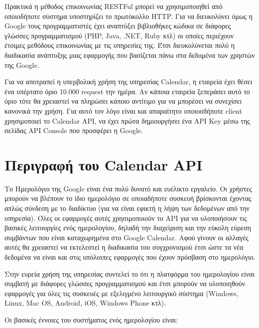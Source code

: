 Πρακτικά η μέθοδος επικοινωνίας RESTFul μπορεί να χρησιμοποιηθεί από οποιοδήποτε σύστημα υποστηρίζει το πρωτόκολλο HTTP. Για να διευκολύνει όμως η Google τους προγραμματιστές έχει αναπτύξει βιβλιοθήκες κώδικα σε διάφορες γλώσσες προγραμματισμού (PHP, Java, .NET, Ruby κτλ) οι οποίες περιέχουν έτοιμες μεθόδους επικοινωνίας με τις υπηρεσίες της. Έτσι διευκολύνεται πολύ η διαδικασία ανάπτυξης μιας εφαρμογής που βασίζεται πάνω στα δεδομένα των χρηστών της Google.

Για να αποτραπεί η υπερβολική χρήση της υπηρεσίας Calendar, η εταιρεία έχει θέσει ένα υπέρτατο όριο 10.000 request την ημέρα. Αν κάποια εταιρεία ξεπεράσει αυτό το όριο τότε θα χρειαστεί να πληρώσει κάποιο αντίτιμο για να μπορέσει να συνεχίσει κανονικά την χρήση. Για αυτό τον λόγο είναι και απαραίτητο οποιοσδήποτε client χρησιμοποιεί το Calendar API, να έχει πρώτα δημιουργήσει ένα API Key μέσω της σελίδας API Console που προσφέρει η Google.

\section {Περιγραφή του Calendar API}
Το Ημερολόγιο της Google είναι ένα πολύ δυνατό και ευέλικτο εργαλείο. Οι χρήστες μπορούν να βλέπουν το ίδιο ημερολόγιο σε οποιαδήποτε συσκευή βρίσκονται έχοντας απλώς σύνδεση με το διαδίκτυο (για να είναι εφικτή η λήψη των δεδομένων από την υπηρεσία). Όλες οι εφαρμογές αυτές χρησιμοποιούν το API για να υλοποιήσουν τις βασικές λειτουργίες ενός ημερολογίου, δηλαδή την διαχείριση και την εύκολη εύρεση συμβάντων που είναι καταχωρημένα στο Google Calendar. Αφού γίνουν οι αλλαγές αυτές θα χρειαστεί να εκτελεστεί η διαδικασία του συγχρονισμού έτσι ώστε τα νέα δεδομένα να είναι και στις υπόλοιπες εφαρμογές που έχουν πρόσβαση στο ημερολόγιο. 

Στην ευρεία χρήση της υπηρεσίας συντελεί το ότι η πλατφόρμα του ημερολογίου είναι συμβατή με διάφορες γλώσσες προγραμματισμού και έτσι μπορούν να υλοποιηθούν εφαρμογές για όλες τις συσκευές με εξελιγμένο λειτουργικό σύστημα (Windows, Linux, Mac OS, Android, iOS, Windows Phone κτλ).

Οι βασικές έννοιες του συστήματος ενός ημερολογίου είναι:


